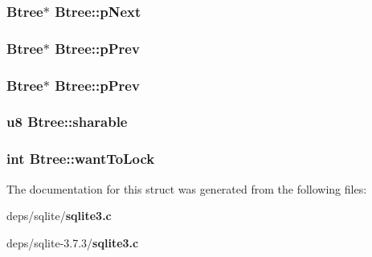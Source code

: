 \subsubsection{\setlength{\rightskip}{0pt plus 5cm}\bf{Btree}$\ast$ \bf{Btree::p\-Next}}\label{structBtree_6f21188f0e5c80a537927a7e620cf8f6}


\subsubsection{\setlength{\rightskip}{0pt plus 5cm}\bf{Btree}$\ast$ \bf{Btree::p\-Prev}}\label{structBtree_af8be5c3a4ff1e7b24eb413427a951ac}


\subsubsection{\setlength{\rightskip}{0pt plus 5cm}\bf{Btree}$\ast$ \bf{Btree::p\-Prev}}\label{structBtree_af8be5c3a4ff1e7b24eb413427a951ac}


\subsubsection{\setlength{\rightskip}{0pt plus 5cm}\bf{u8} \bf{Btree::sharable}}\label{structBtree_0d543bf8ca76dd6b79ab58f59bb9e7a0}


\subsubsection{\setlength{\rightskip}{0pt plus 5cm}int \bf{Btree::want\-To\-Lock}}\label{structBtree_5cdd418390fd48c20e0265eb14cd2d2c}




The documentation for this struct was generated from the following files:\begin{CompactItemize}
\item 
deps/sqlite/\bf{sqlite3.c}\item 
deps/sqlite-3.7.3/\bf{sqlite3.c}\end{CompactItemize}
